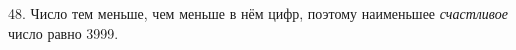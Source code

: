 48. Число тем меньше, чем меньше в нём цифр, поэтому наименьшее {\it счастливое} число равно 3999.\\
